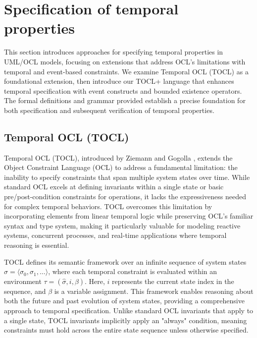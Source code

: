 \section{Specification of temporal properties}
\hspace{1cm} This section introduces approaches for specifying temporal properties 
in UML/OCL models, focusing on extensions that address OCL's limitations with temporal 
and event-based constraints. We examine Temporal OCL (TOCL) as a foundational extension, 
then introduce our TOCL+ language that enhances temporal specification with event 
constructs and bounded existence operators. The formal definitions and grammar 
provided establish a precise foundation for both specification and subsequent 
verification of temporal properties.

\subsection{Temporal OCL (TOCL)}

\hspace{1cm} Temporal OCL (TOCL), introduced by Ziemann and Gogolla \cite{TOCL}, extends the Object Constraint Language (OCL) to address a fundamental limitation: the inability to specify constraints that span multiple system states over time. While standard OCL excels at defining invariants within a single state or basic pre/post-condition constraints for operations, it lacks the expressiveness needed for complex temporal behaviors. TOCL overcomes this limitation by incorporating elements from linear temporal logic while preserving OCL's familiar syntax and type system, making it particularly valuable for modeling reactive systems, concurrent processes, and real-time applications where temporal reasoning is essential.

TOCL defines its semantic framework over an infinite sequence of system states $\hat{\sigma} = \langle \sigma_0, \sigma_1, \ldots \rangle$, where each temporal constraint is evaluated within an environment $\tau = (\hat{\sigma}, i, \beta)$. Here, $i$ represents the current state index in the sequence, and $\beta$ is a variable assignment. This framework enables reasoning about both the future and past evolution of system states, providing a comprehensive approach to temporal specification. Unlike standard OCL invariants that apply to a single state, TOCL invariants implicitly apply an "always" condition, meaning constraints must hold across the entire state sequence unless otherwise specified.

